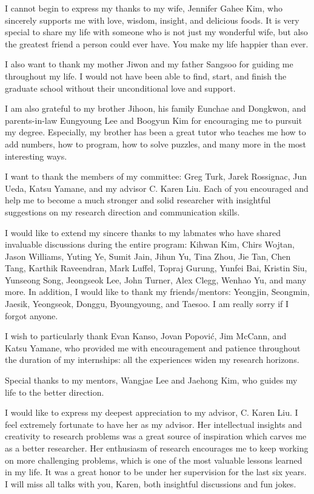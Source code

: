 I cannot begin to express my thanks to my wife, Jennifer Gahee Kim,
who sincerely supports me with love, wisdom, insight, and delicious foods.
It is very special to share my life with someone who is not just my wonderful
wife, but also the greatest friend a person could ever have.
You make my life happier than ever.

I also want to thank my mother Jiwon and my father Sangsoo for guiding me
throughout my life.
I would not have been able to find, start, and finish the graduate school without
their unconditional love and support.

I am also grateful to my brother Jihoon, his family Eunchae and Dongkwon,
and parents-in-law Eungyoung Lee and Boogyun Kim for encouraging me to pursuit
my degree.
Especially, my brother has been a great tutor who teaches me
how to add numbers, how to program, how to solve puzzles, and many more
in the most interesting ways.

I want to thank the members of my committee: Greg Turk, Jarek Rossignac,
Jun Ueda, Katsu Yamane, and my advisor C. Karen Liu.
Each of you encouraged and help me to become a much stronger and solid
researcher with insightful suggestions on my research direction and
communication skills.

I would like to extend my sincere thanks to my labmates
who have shared invaluable discussions during the entire program:
Kihwan Kim, Chirs Wojtan, Jason Williams, Yuting Ye, Sumit Jain,
Jihun Yu, Tina Zhou, Jie Tan, Chen Tang, Karthik Raveendran, Mark Luffel,
Topraj Gurung, Yunfei Bai, Kristin Siu, Yunseong Song, Jeongseok Lee,
John Turner, Alex Clegg, Wenhao Yu, and many more.
In addition, I would like to thank my friends/mentors: Yeongjin, Seongmin,
Jaesik, Yeongseok, Donggu, Byoungyoung, and Taesoo.
I am really sorry if I forgot anyone.

I wish to particularly thank Evan Kanso, Jovan Popovi\'{c}, Jim McCann, and
Katsu Yamane, who provided me with encouragement and patience throughout the
duration of my internships: all the experiences widen my research horizons.

Special thanks to my mentors, Wangjae Lee and Jaehong Kim, who
guides my life to the better direction.

I would like to express my deepest appreciation to my advisor, C. Karen Liu.
I feel extremely fortunate to have her as my advisor.
Her intellectual insights and creativity to research problems was a great
source of inspiration which carves me as a better researcher.
Her enthusiasm of research encourages me to keep working on more challenging
problems, which is one of the most valuable lessons learned in my life.
It was a great honor to be under her supervision for the last six years.
I will miss all talks with you, Karen, both insightful discussions and fun jokes. 













